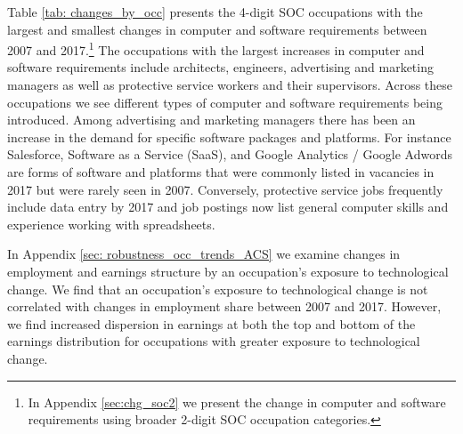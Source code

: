 \documentclass[12pt]{article}
\begin{document}
{Table \ref{tab: changes_by_occ} presents the 4-digit SOC occupations with the largest and smallest changes in computer and software requirements between 2007 and 2017.\footnote{In Appendix \ref{sec:chg_soc2} we present the change in computer and software requirements using broader 2-digit SOC occupation categories. }  The occupations with the largest increases in computer and software requirements include architects, engineers, advertising and marketing managers as well as protective service workers and their supervisors. Across these occupations we see different types of computer and software requirements being introduced. Among advertising and marketing managers there has been an increase in the demand for specific software packages and platforms. For instance Salesforce, Software as a Service (SaaS), and Google Analytics / Google Adwords are forms of software and platforms that were commonly listed in vacancies in 2017 but were rarely seen in 2007. Conversely, protective service jobs frequently include data entry by 2017 and job postings now list general computer skills and experience working with spreadsheets. 

In Appendix \ref{sec: robustness_occ_trends_ACS} we examine changes in employment and earnings structure by an occupation's exposure to technological change. We find that an occupation's exposure to technological change is not correlated with changes in employment share between 2007 and 2017. However, we find increased dispersion in earnings at both the top and bottom of the earnings distribution for occupations with greater exposure to technological change. 


\begin{landscape}
	

\end{landscape}}
\end{document}
